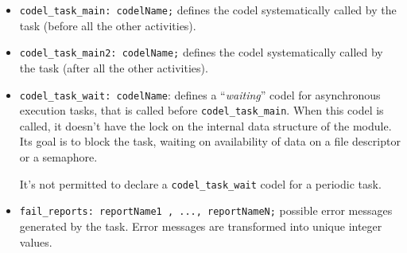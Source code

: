 \begin{itemize}
\item[]\texttt{codel\_task\_main:  codelName;} defines the codel systematically
called by the task (before all the other activities).

\item[]\texttt{codel\_task\_main2:  codelName;} defines the codel systematically
called by the task (after all the other activities).

\item[]\texttt{codel\_task\_wait: codelName}: defines a
``\emph{waiting}'' codel for asynchronous execution tasks, that is
called before \texttt{codel\_task\_main}.  When this codel
is called, it doesn't have the lock on the internal data structure of
the module. Its goal is to block the task, waiting on availability of
data on a file descriptor or a semaphore.

It's not permitted to declare a \texttt{codel\_task\_wait} codel for a
periodic task.

\item[]\texttt{fail\_reports:  reportName1 , ..., reportNameN;}
possible error messages generated by the task. Error messages are
transformed into unique integer values.
\end{itemize}

